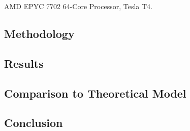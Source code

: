 \documentclass[]{article}
\begin{document}
AMD EPYC 7702 64-Core Processor, Tesla T4.


\subsection{Methodology}

\subsection{Results}


\begin{comment}
	\begin{figure}[H]
		\begin{center}
			\begin{tikzpicture}
				\begin{axis}[
					height=10cm,width=13cm, 
					title={Measured Performance with $d = 1024$},
					xlabel={Particle Count},
					ylabel={Execution Time (ms)},
					]
					
					\foreach \i in {0,...,3}{
						\pgfmathsetmacro\suffix{int(pow(2,\i))};
						
						\addplot +[] 
						table [col sep=comma, x=N, y=time] 
						{../../code/out/measurements\suffix.csv};
						
						\addlegendentryexpanded{\# $\suffix$};
						
					}	
				\end{axis}
			\end{tikzpicture}
		\end{center}
	\end{figure}
\end{comment}


\subsection{Comparison to Theoretical Model}


\subsection{Conclusion}


%

\end{document}

